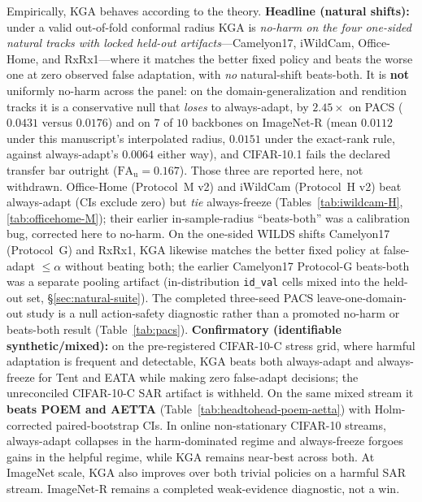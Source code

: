 \documentclass[conference]{IEEEtran}
\theoremstyle{plain}
\theoremstyle{definition}
\begin{document}
Empirically, \textsc{KGA} behaves according to the theory. \textbf{Headline (natural shifts):}
under a valid out-of-fold conformal radius \textsc{KGA} is \emph{no-harm on the four one-sided
natural tracks with locked held-out artifacts}---Camelyon17, iWildCam, Office-Home, and
RxRx1---where it matches the better fixed policy and beats the worse one at zero observed
false adaptation, with \emph{no} natural-shift beats-both. It is \textbf{not} uniformly no-harm
across the panel: on the domain-generalization and rendition tracks it is a conservative null that
\emph{loses} to always-adapt, by $2.45\times$ on PACS ($0.0431$ versus $0.0176$) and on $7$ of $10$
backbones on ImageNet-R (mean $0.0112$ under this manuscript's interpolated radius,
$0.0151$ under the exact-rank rule, against always-adapt's $0.0064$ either way), and CIFAR-10.1 fails the declared
transfer bar outright ($\mathrm{FA}_{\mathrm u}=0.167$). Those three are reported here, not
withdrawn. Office-Home (Protocol~M v2) and iWildCam
(Protocol~H v2) beat always-adapt (CIs exclude zero) but \emph{tie} always-freeze
(Tables~\ref{tab:iwildcam-H}, \ref{tab:officehome-M}); their earlier in-sample-radius
``beats-both'' was a calibration bug, corrected here to no-harm. On the one-sided WILDS shifts
Camelyon17 (Protocol~G) and RxRx1, \textsc{KGA} likewise matches the better fixed policy at
false-adapt $\le\alpha$ without beating both; the earlier Camelyon17 Protocol-G beats-both was a
separate pooling artifact (in-distribution \texttt{id\_val} cells mixed into the held-out set,
\S\ref{sec:natural-suite}). The completed three-seed PACS leave-one-domain-out study is a null
action-safety diagnostic rather than a promoted no-harm or beats-both result
(Table~\ref{tab:pacs}). \textbf{Confirmatory (identifiable synthetic/mixed):} on the pre-registered
CIFAR-10-C stress grid, where harmful adaptation is frequent and detectable, \textsc{KGA} beats both
always-adapt and always-freeze for Tent and EATA while making zero false-adapt decisions; the
unreconciled CIFAR-10-C SAR artifact is withheld. On the same mixed stream it \textbf{beats POEM and AETTA}
(Table~\ref{tab:headtohead-poem-aetta}) with Holm-corrected paired-bootstrap CIs. In online
non-stationary CIFAR-10 streams, always-adapt collapses in the harm-dominated regime and
always-freeze forgoes gains in the helpful regime, while \textsc{KGA} remains near-best across
both. At ImageNet scale, \textsc{KGA} also improves over both trivial policies on a harmful SAR
stream. ImageNet-R remains a completed weak-evidence diagnostic, not a win.
\end{document}
